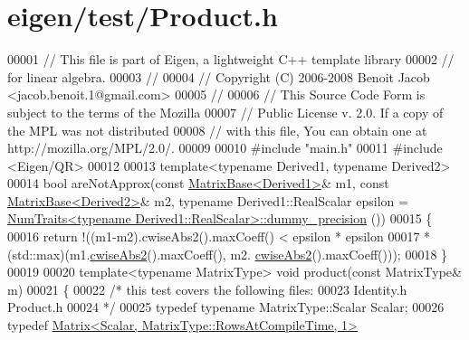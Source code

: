 \hypertarget{eigen_2test_2_product_8h_source}{}\section{eigen/test/\+Product.h}
\label{eigen_2test_2_product_8h_source}

\begin{DoxyCode}
00001 \textcolor{comment}{// This file is part of Eigen, a lightweight C++ template library}
00002 \textcolor{comment}{// for linear algebra.}
00003 \textcolor{comment}{//}
00004 \textcolor{comment}{// Copyright (C) 2006-2008 Benoit Jacob <jacob.benoit.1@gmail.com>}
00005 \textcolor{comment}{//}
00006 \textcolor{comment}{// This Source Code Form is subject to the terms of the Mozilla}
00007 \textcolor{comment}{// Public License v. 2.0. If a copy of the MPL was not distributed}
00008 \textcolor{comment}{// with this file, You can obtain one at http://mozilla.org/MPL/2.0/.}
00009 
00010 \textcolor{preprocessor}{#include "main.h"}
00011 \textcolor{preprocessor}{#include <Eigen/QR>}
00012 
00013 \textcolor{keyword}{template}<\textcolor{keyword}{typename} Derived1, \textcolor{keyword}{typename} Derived2>
00014 \textcolor{keywordtype}{bool} areNotApprox(\textcolor{keyword}{const} \hyperlink{group___core___module_class_eigen_1_1_matrix_base}{MatrixBase<Derived1>}& m1, \textcolor{keyword}{const} 
      \hyperlink{group___core___module_class_eigen_1_1_matrix_base}{MatrixBase<Derived2>}& m2, \textcolor{keyword}{typename} Derived1::RealScalar epsilon = 
      \hyperlink{group___core___module_struct_eigen_1_1_num_traits}{NumTraits<typename Derived1::RealScalar>::dummy\_precision}
      ())
00015 \{
00016   \textcolor{keywordflow}{return} !((m1-m2).cwiseAbs2().maxCoeff() < epsilon * epsilon
00017                           * (std::max)(m1.\hyperlink{group___core___module_a60808fcf09547e14952957bbdf75d3c6}{cwiseAbs2}().maxCoeff(), m2.
      \hyperlink{group___core___module_a60808fcf09547e14952957bbdf75d3c6}{cwiseAbs2}().maxCoeff()));
00018 \}
00019 
00020 \textcolor{keyword}{template}<\textcolor{keyword}{typename} MatrixType> \textcolor{keywordtype}{void} product(\textcolor{keyword}{const} MatrixType& m)
00021 \{
00022   \textcolor{comment}{/* this test covers the following files:}
00023 \textcolor{comment}{     Identity.h Product.h}
00024 \textcolor{comment}{  */}
00025   \textcolor{keyword}{typedef} \textcolor{keyword}{typename} MatrixType::Scalar Scalar;
00026   \textcolor{keyword}{typedef} \hyperlink{group___core___module_class_eigen_1_1_matrix}{Matrix<Scalar, MatrixType::RowsAtCompileTime, 1>} 

\end{DoxyCode}
